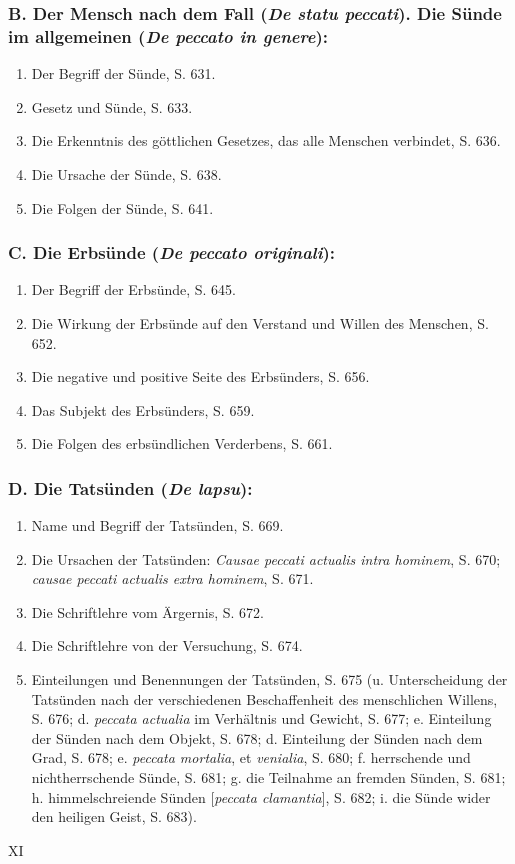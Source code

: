 \subsubsection*{B. Der Mensch nach dem Fall (\emph{De statu peccati}). Die Sünde im allgemeinen (\emph{De peccato in genere}):}
\begin{enumerate}
    \item Der Begriff der Sünde, S. 631.
    \item Gesetz und Sünde, S. 633.
    \item Die Erkenntnis des göttlichen Gesetzes, das alle Menschen verbindet, S. 636.
    \item Die Ursache der Sünde, S. 638.
    \item Die Folgen der Sünde, S. 641.
\end{enumerate}

\subsubsection*{C. Die Erbsünde (\emph{De peccato originali}):}
\begin{enumerate}
    \item Der Begriff der Erbsünde, S. 645.
    \item Die Wirkung der Erbsünde auf den Verstand und Willen des Menschen, S. 652.
    \item Die negative und positive Seite des Erbsünders, S. 656.
    \item Das Subjekt des Erbsünders, S. 659.
    \item Die Folgen des erbsündlichen Verderbens, S. 661.
\end{enumerate}

\subsubsection*{D. Die Tatsünden (\emph{De lapsu}):}
\begin{enumerate}
    \item Name und Begriff der Tatsünden, S. 669.
    \item Die Ursachen der Tatsünden: \emph{Causae peccati actualis intra hominem}, S. 670; \emph{causae peccati actualis extra hominem}, S. 671.
    \item Die Schriftlehre vom Ärgernis, S. 672.
    \item Die Schriftlehre von der Versuchung, S. 674.
    \item Einteilungen und Benennungen der Tatsünden, S. 675 (u. Unterscheidung der Tatsünden nach der verschiedenen Beschaffenheit des menschlichen Willens, S. 676; d. \emph{peccata actualia} im Verhältnis und Gewicht, S. 677; e. Einteilung der Sünden nach dem Objekt, S. 678; d. Einteilung der Sünden nach dem Grad, S. 678; e. \emph{peccata mortalia}, et \emph{venialia}, S. 680; f. herrschende und nichtherrschende Sünde, S. 681; g. die Teilnahme an fremden Sünden, S. 681; h. himmelschreiende Sünden [\emph{peccata clamantia}], S. 682; i. die Sünde wider den heiligen Geist, S. 683).
\end{enumerate}

\vfill
\noindent\hfill XI

